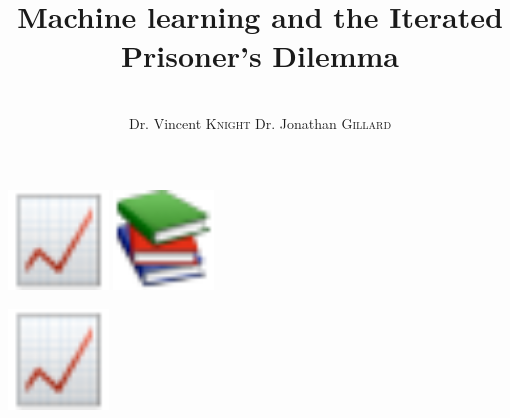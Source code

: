 \documentclass{beamer}
\title{\textbf{Machine learning and the Iterated Prisoner's Dilemma}}
\date{\\ \small{Dr. Vincent \textsc{Knight} \hspace{.5cm}  Dr. Jonathan \textsc{Gillard} }}
\institute[]
{\textbf{SECOND YEAR REPORT}}
\begin{document}
\maketitle 

\begin{frame}
    \begin{center}
    \includegraphics[width=0.20\textwidth]{static/progress.pdf} \hspace{30pt}
    \includegraphics[width=0.20\textwidth]{static/learn.pdf}
    \end{center}
\end{frame}

\begin{frame}
    \begin{center}
    \includegraphics[width=0.20\textwidth]{static/progress.pdf} \hspace{30pt}
    \end{center}
\end{frame}
\end{document}
